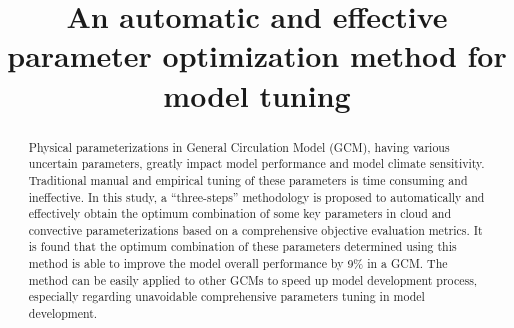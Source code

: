 \documentclass[gmd, manuscript]{copernicus}
\begin{document}
\linenumbers

\title{An automatic and effective parameter optimization method for model tuning}

















\maketitle
 

\begin{abstract}  

Physical parameterizations in General Circulation Model (GCM), having various uncertain parameters, greatly impact model performance and model climate sensitivity.  Traditional manual and empirical tuning of these parameters is time consuming and ineffective. In this study, a ``three-steps'' methodology is proposed to automatically and effectively obtain the optimum  combination of some key parameters in cloud and convective parameterizations based on a comprehensive objective evaluation metrics. It is found that the optimum combination of these parameters determined using this method is able to improve the model overall performance by 9\% in a GCM. The method can be easily applied to other GCMs to speed up model development process, especially regarding unavoidable comprehensive parameters tuning in model development.

\end{abstract}


\introduction  %
\end{document}
